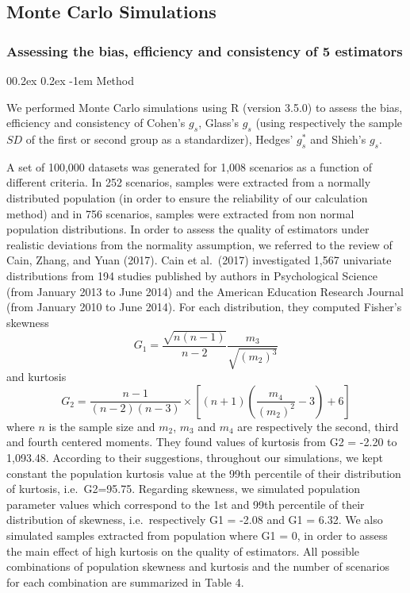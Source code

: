 \documentclass[
  english,
  man,floatsintext]{apa6}
\makeatletter
\let\oldparagraph\paragraph
\renewcommand{\paragraph}[1]{\oldparagraph{#1}\mbox{}}
\renewcommand{\paragraph}{\@startsection{paragraph}{4}{\parindent}%
  {0\baselineskip \@plus 0.2ex \@minus 0.2ex}%
  {-1em}%
  {\normalfont\normalsize\bfseries\itshape\typesectitle}}
\makeatother
\begin{document}
\hypertarget{monte-carlo-simulations}{%
\subsection{Monte Carlo Simulations}\label{monte-carlo-simulations}}

\hypertarget{assessing-the-bias-efficiency-and-consistency-of-5-estimators}{%
\subsubsection{Assessing the bias, efficiency and consistency of 5 estimators}\label{assessing-the-bias-efficiency-and-consistency-of-5-estimators}}

\hypertarget{method}{%
\paragraph{Method}\label{method}}

We performed Monte Carlo simulations using R (version 3.5.0) to assess the bias, efficiency and consistency of Cohen's \(g_s\), Glass's \(g_s\) (using respectively the sample \(SD\) of the first or second group as a standardizer), Hedges' \(g^*_s\) and Shieh's \(g_s\).

A set of 100,000 datasets was generated for 1,008 scenarios as a function of different criteria. In 252 scenarios, samples were extracted from a normally distributed population (in order to ensure the reliability of our calculation method) and in 756 scenarios, samples were extracted from non normal population distributions. In order to assess the quality of estimators under realistic deviations from the normality assumption, we referred to the review of Cain, Zhang, and Yuan (2017). Cain et al.~(2017) investigated 1,567 univariate distributions from 194 studies published by authors in Psychological Science (from January 2013 to June 2014) and the American Education Research Journal (from January 2010 to June 2014). For each distribution, they computed Fisher's skewness
\[G_{1}=\frac{\sqrt{n(n-1)}}{n-2} \frac{m_{3}}{\sqrt{(m_{2})^3}}\]
and kurtosis \[G_{2}=\frac{n-1}{(n-2)(n-3)}\times \left[(n+1)\left(\frac{m_{4}}{(m_{2})^2}-3\right)+6\right]\]
where \(n\) is the sample size and \(m_{2}\), \(m_{3}\) and \(m_{4}\) are respectively the second, third and fourth centered moments. They found values of kurtosis from G2 = -2.20 to 1,093.48. According to their suggestions, throughout our simulations, we kept constant the population kurtosis value at the 99th percentile of their distribution of kurtosis, i.e.~G2=95.75. Regarding skewness, we simulated population parameter values which correspond to the 1st and 99th percentile of their distribution of skewness, i.e.~respectively G1 = -2.08 and G1 = 6.32. We also simulated samples extracted from population where G1 = 0, in order to assess the main effect of high kurtosis on the quality of estimators. All possible combinations of population skewness and kurtosis and the number of scenarios for each combination are summarized in Table 4.
\end{document}
